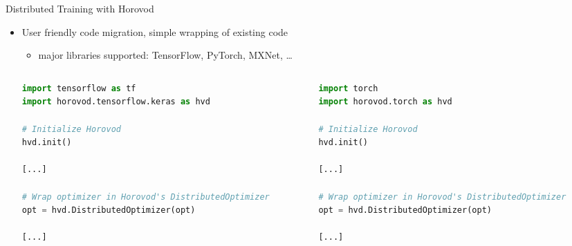 \begin{frame}[fragile]{Distributed Training with Horovod}
\protect\hypertarget{distributed-training-with-horovod-2}{}

\begin{itemize}
\tightlist
\item
  User friendly code migration, simple wrapping of existing code

  \begin{itemize}
  \tightlist
  \item
    major libraries supported: TensorFlow, PyTorch, MXNet, \ldots{}
  \end{itemize}

  \begin{columns}[T]
  \begin{column}{0.5\textwidth}
\begin{lstlisting}[language=Python]
import tensorflow as tf
import horovod.tensorflow.keras as hvd

# Initialize Horovod
hvd.init()

[...]

# Wrap optimizer in Horovod's DistributedOptimizer
opt = hvd.DistributedOptimizer(opt)

[...]
\end{lstlisting}
  \end{column}

  \begin{column}{0.5\textwidth}
\begin{lstlisting}[language=Python]
import torch
import horovod.torch as hvd

# Initialize Horovod
hvd.init()

[...]

# Wrap optimizer in Horovod's DistributedOptimizer
opt = hvd.DistributedOptimizer(opt)

[...]
\end{lstlisting}
  \end{column}
  \end{columns}
\end{itemize}

\end{frame}

